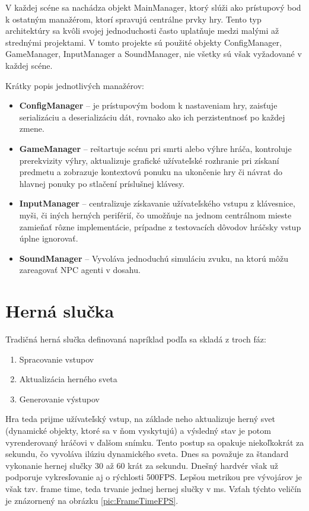 \documentclass[slovak, master]{diploma}
\begin{document}
V každej scéne sa nachádza objekt MainManager, ktorý slúži ako prístupový bod k ostatným manažérom, ktorí spravujú centrálne prvky hry. Tento typ architektúry sa kvôli svojej jednoduchosti často uplatňuje medzi malými až strednými projektami. V tomto projekte sú použité objekty ConfigManager, GameManager, InputManager a SoundManager, nie všetky sú však vyžadované v každej scéne. 

Krátky popis jednotlivých manažérov:
\begin{itemize}
  \item \textbf{ConfigManager} -- je prístupovým bodom k nastaveniam hry, zaisťuje serializáciu a deserializáciu dát, rovnako ako ich perzistentnosť po každej zmene.
  \item \textbf{GameManager} -- reštartuje scénu pri smrti alebo výhre hráča, kontroluje prerekvizity výhry, aktualizuje grafické užívateľské rozhranie pri získaní predmetu a zobrazuje kontextovú ponuku na ukončenie hry či návrat do hlavnej ponuky po stlačení príslušnej klávesy.
  \item \textbf{InputManager} -- centralizuje získavanie užívateľského vstupu z klávesnice, myši, či iných herných periférií, čo umožňuje na jednom centrálnom mieste zamieňať rôzne implementácie, prípadne z testovacích dôvodov hráčsky vstup úplne ignorovať. 
  \item \textbf{SoundManager} -- Vyvoláva jednoduchú simuláciu zvuku, na ktorú môžu zareagovať NPC agenti v dosahu.
\end{itemize}

\section{Herná slučka}
\label{sec:GameLoop}
Tradičná herná slučka definovaná napríklad podľa \cite{GameAlgorithms} sa skladá z troch fáz:

\begin{enumerate}
  \item Spracovanie vstupov
  \item Aktualizácia herného sveta
  \item Generovanie výstupov
\end{enumerate}

Hra teda prijme užívateľský vstup, na základe neho aktualizuje herný svet (dynamické objekty, ktoré sa v ňom vyskytujú) a výsledný stav je potom vyrenderovaný hráčovi v ďalšom snímku. Tento postup sa opakuje niekoľkokrát za sekundu, čo vyvoláva ilúziu dynamického sveta. Dnes sa považuje za štandard vykonanie hernej slučky 30 až 60 krát za sekundu. Dnešný hardvér však už podporuje vykresľovanie aj o rýchlosti 500FPS. Lepšou metrikou pre vývojárov je však tzv. frame time, teda trvanie jednej hernej slučky v ms. Vzťah týchto veličín je znázornený na obrázku \ref{pic:FrameTimeFPS}.
\end{document}
